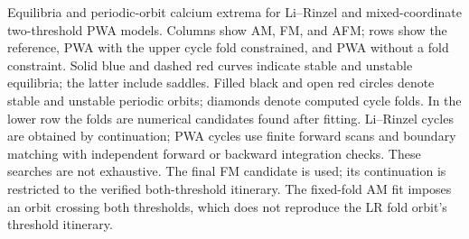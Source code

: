 Equilibria and periodic-orbit calcium extrema for Li--Rinzel and mixed-coordinate two-threshold PWA models. Columns show AM, FM, and AFM; rows show the reference, PWA with the upper cycle fold constrained, and PWA without a fold constraint. Solid blue and dashed red curves indicate stable and unstable equilibria; the latter include saddles. Filled black and open red circles denote stable and unstable periodic orbits; diamonds denote computed cycle folds. In the lower row the folds are numerical candidates found after fitting. Li--Rinzel cycles are obtained by continuation; PWA cycles use finite forward scans and boundary matching with independent forward or backward integration checks. These searches are not exhaustive. The final FM candidate is used; its continuation is restricted to the verified both-threshold itinerary. The fixed-fold AM fit imposes an orbit crossing both thresholds, which does not reproduce the LR fold orbit's threshold itinerary.
